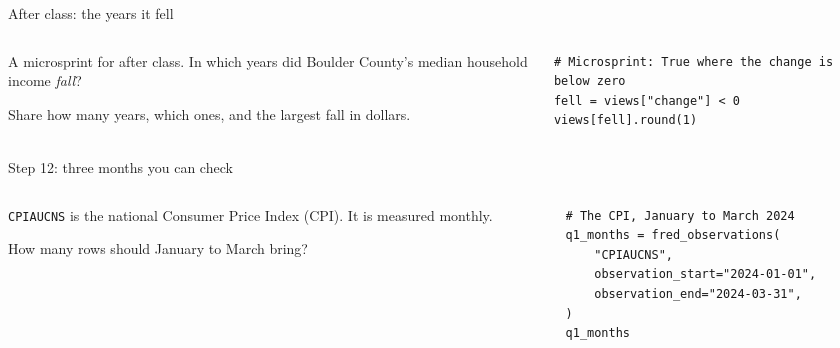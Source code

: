 \documentclass[9pt,aspectratio=169]{beamer}
\begin{document}
\begin{frame}[fragile]{After class: the years it fell}
    \begin{columns}[T]
        \begin{column}{0.37\textwidth}
            A microsprint for after class. In which years did Boulder County's median household income \textit{fall}?

            \medskip
            Share how many years, which ones, and the largest fall in dollars.
        \end{column}
        \begin{column}{0.6\textwidth}
\begin{lstlisting}
# Microsprint: True where the change is below zero
fell = views["change"] < 0
views[fell].round(1)
\end{lstlisting}
        \end{column}
    \end{columns}
\end{frame}

\begin{frame}[fragile]{Step 12: three months you can check}
    \begin{columns}[T]
        \begin{column}{0.37\textwidth}
            \texttt{CPIAUCNS} is the national Consumer Price Index (CPI). It is measured monthly.

            \medskip
            How many rows should January to March bring?
        \end{column}
        \begin{column}{0.6\textwidth}
\begin{lstlisting}
# The CPI, January to March 2024
q1_months = fred_observations(
    "CPIAUCNS",
    observation_start="2024-01-01",
    observation_end="2024-03-31",
)
q1_months
\end{lstlisting}
        \end{column}
    \end{columns}
\end{frame}
\end{document}
